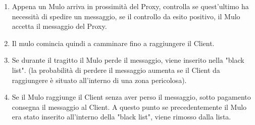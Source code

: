 \documentclass[13pt,a4paper]{article}
\begin{document}
\begin{enumerate}
	\item Appena un Mulo arriva in prossimità del Proxy, controlla se quest'ultimo ha necessità di spedire un messaggio, se il controllo da esito positivo, il Mulo accetta il messaggio del Proxy.
	\item Il mulo comincia quindi a camminare fino a raggiungere il Client.
	\item Se durante il tragitto il Mulo perde il messaggio, viene inserito nella "black list". (la probabilità di perdere il messaggio aumenta se il Client da raggiungere è situato all'interno di una zona pericolosa).
	\item Se il Mulo raggiunge il Client senza aver perso il messaggio, sotto pagamento consegna il messaggio al Client. A questo punto se precedentemente il Mulo era stato inserito all'interno della "black list", viene rimosso dalla lista.
\end{enumerate}
\end{document}
